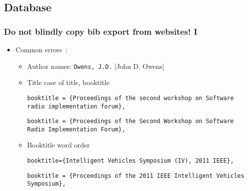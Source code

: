 \documentclass[CJKchecksingle]{beamer}
\begin{document}
\subsection{Database}
\begin{frame}[fragile]
  \frametitle{Do not blindly copy bib export from websites! I}

  \begin{itemize}
    \item Common errors~\cite{biberrors}:
      \begin{itemize}
        \item<1->
          Author names: \lstinline[style=wrong]|Owens, J.D.|
          |John D. Owens|
        \item<2->
          Title case of title, booktitle
\begin{lstlisting}[style=wrong]
booktitle = {Proceedings of the second workshop on Software radio implementation forum},
\end{lstlisting}
\begin{lstlisting}
booktitle = {Proceedings of the Second Workshop on Software Radio Implementation Forum},
\end{lstlisting}%
        \item<3->
          Booktitle word order
\begin{lstlisting}[style=wrong]
booktitle={Intelligent Vehicles Symposium (IV), 2011 IEEE},
\end{lstlisting}
\begin{lstlisting}
booktitle = {Proceedings of the 2011 IEEE Intelligent Vehicles Symposium},
\end{lstlisting}
\end{itemize}
\end{itemize}
\end{frame}
\end{document}
